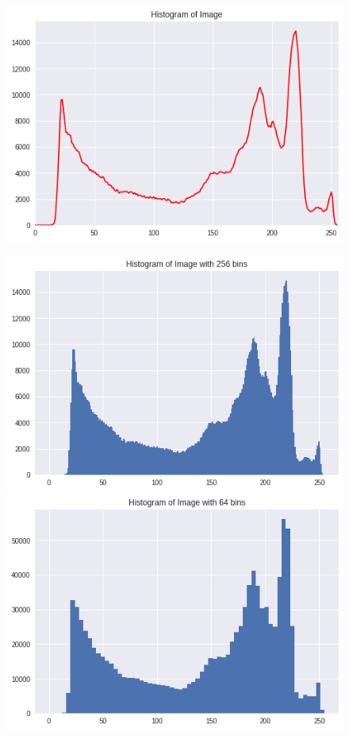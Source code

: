 \documentclass{article}
\begin{document}
\begin{enumerate}[label=B\arabic*)]
\begin{enumerate}[label=\arabic*)]
\begin{figure}[h!]
\begin{minipage}{0.48\textwidth}
					\end{minipage}
				\end{figure}
				\begin{figure}[h!]
					\centering
					\includegraphics[width=0.6\linewidth]{Pork/Histogram.png}
				\end{figure}
				\begin{figure}[h!]
					\begin{minipage}{0.48\textwidth}
						\centering
						\includegraphics[width=0.9\linewidth]{Pork/Histogram(bin-256).png}
			            					\end{minipage}
					\hfill
					\begin{minipage}{0.48\textwidth}
						\centering
						\includegraphics[width=0.9\linewidth]{Pork/Histogram(bin-64).png}

\end{minipage}
\end{figure}
\end{enumerate}
\end{enumerate}
\end{document}
